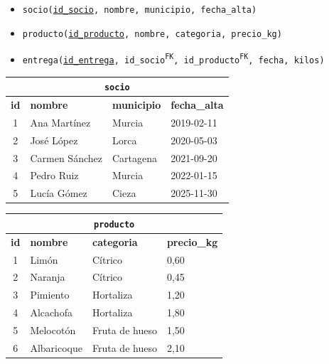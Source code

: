 \documentclass[11pt,a4paper]{article}
\begin{document}
\begin{itemize}
  \item \texttt{socio(\underline{id\_socio}, nombre, municipio, fecha\_alta)}
  \item \texttt{producto(\underline{id\_producto}, nombre, categoria, precio\_kg)}
  \item \texttt{entrega(\underline{id\_entrega}, id\_socio\textsuperscript{FK},
        id\_producto\textsuperscript{FK}, fecha, kilos)}
\end{itemize}

\begin{table}[H]
\centering\small
\begin{tabular}{@{}clll@{}}
\toprule
\multicolumn{4}{c}{\texttt{socio}} \\
\midrule
\textbf{id} & \textbf{nombre} & \textbf{municipio} & \textbf{fecha\_alta} \\
1 & Ana Martínez   & Murcia    & 2019-02-11 \\
2 & José López     & Lorca     & 2020-05-03 \\
3 & Carmen Sánchez & Cartagena & 2021-09-20 \\
4 & Pedro Ruiz     & Murcia    & 2022-01-15 \\
5 & Lucía Gómez    & Cieza     & 2025-11-30 \\
\bottomrule
\end{tabular}
\hfill
\begin{tabular}{@{}clll@{}}
\toprule
\multicolumn{4}{c}{\texttt{producto}} \\
\midrule
\textbf{id} & \textbf{nombre} & \textbf{categoria} & \textbf{precio\_kg} \\
1 & Limón       & Cítrico        & 0,60 \\
2 & Naranja     & Cítrico        & 0,45 \\
3 & Pimiento    & Hortaliza      & 1,20 \\
4 & Alcachofa   & Hortaliza      & 1,80 \\
5 & Melocotón   & Fruta de hueso & 1,50 \\
6 & Albaricoque & Fruta de hueso & 2,10 \\
\bottomrule
\end{tabular}


\end{table}
\end{document}

